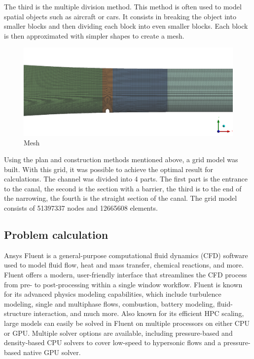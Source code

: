 	The third is the multiple division method. This method is often used to model spatial objects such as aircraft or cars. It consists in breaking the object into smaller blocks and then dividing each block into even smaller blocks. Each block is then approximated with simpler shapes to create a mesh.
	
	\begin{figure}[H]
		\centering
		\includegraphics[width=1\linewidth]{../Assets/Mesh1}
		\caption{\footnotesize{Mesh}}
		\label{fig:mesh1}
	\end{figure}
	Using the plan and construction methods mentioned above, a grid model was built. With this grid, it was possible to achieve the optimal result for calculations. The channel was divided into 4 parts. The first part is the entrance to the canal, the second is the section with a barrier, the third is to the end of the narrowing, the fourth is the straight section of the canal. The grid model consists of 51397337 nodes and 12665608 elements.
	
\subsection{Problem calculation}
	Ansys Fluent is a general-purpose computational fluid dynamics (CFD) software used to model fluid flow, heat and mass transfer, chemical reactions, and more. Fluent offers a modern, user-friendly interface that streamlines the CFD process from pre- to post-processing within a single window workflow. Fluent is known for its advanced physics modeling capabilities, which include turbulence modeling, single and multiphase flows, combustion, battery modeling, fluid-structure interaction, and much more. Also known for its efficient HPC scaling, large models can easily be solved in Fluent on multiple processors on either CPU or GPU. Multiple solver options are available, including pressure-based and density-based CPU solvers to cover low-speed to hypersonic flows and a pressure-based native GPU solver.
	
